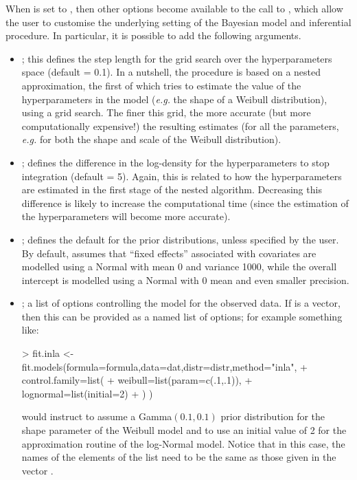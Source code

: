 \documentclass[article,nojss]{jss}
\newcommand{\eg}{{\em e.g.\/}\xspace}
\newcommand{\INLA}{\proglang{INLA}\xspace}
\begin{document}
When  is set to , then other options become available to the call to , which allow the user to customise the underlying setting of the Bayesian model and inferential procedure. In particular, it is possible to add the following arguments.
\begin{itemize}
\item {}; this defines the step length for the grid search over the hyperparameters space (default = 0.1). In a nutshell, the \INLA procedure is based on a nested approximation, the first of which tries to estimate the value of the hyperparameters in the model (\eg the shape of a Weibull distribution), using a grid search. The finer this grid, the more accurate (but more computationally expensive!) the resulting estimates (for all the parameters, \eg for both the shape and scale of the Weibull distribution). 
\item {}; defines the difference in the log-density for the hyperparameters to stop integration (default = 5). Again, this is related to how the hyperparameters are estimated in the first stage of the nested algorithm. Decreasing this difference is likely to increase the computational time (since the estimation of the hyperparameters will become more accurate).
\item {}; defines the default for the prior distributions, unless specified by the user. By default, \INLA assumes that ``fixed effects'' associated with covariates are modelled using a Normal with mean 0 and variance 1000, while the overall intercept is modelled using a Normal with 0 mean and even smaller precision.
\item {}; a list of options controlling the model for the observed data. If  is a vector, then this can be provided as a named list of options; for example something like: 
\begin{CodeInput}
> fit.inla <- fit.models(formula=formula,data=dat,distr=distr,method="inla",
+     control.family=list(
+                    weibull=list(param=c(.1,.1)),
+                    lognormal=list(initial=2)
+     )
)
\end{CodeInput}
would instruct \INLA to assume a Gamma$(0.1,0.1)$ prior distribution for the shape parameter of the Weibull model and to use an initial value of 2 for the approximation routine of the log-Normal model. Notice that in this case, the names of the elements of the list need to be the same as those given in the vector .
\end{itemize}
\end{document}
